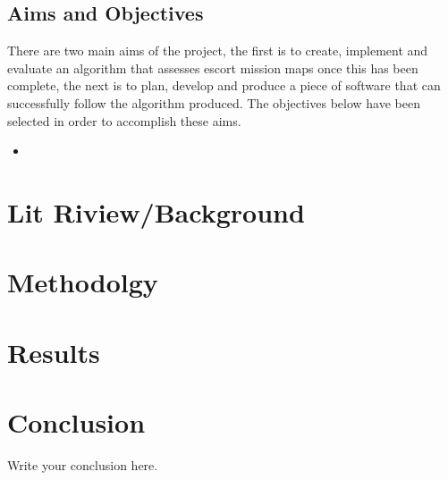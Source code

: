 \documentclass{article}
\begin{document}
\subsection{Aims and Objectives}
There are two main aims of the project, the first is to create, implement and evaluate an algorithm that assesses escort mission maps once this has been complete, the next is to plan, develop and produce a piece of software that can successfully follow the algorithm produced. The objectives below have been selected in order to accomplish these aims.
 \begin{itemize}
	\item 
\end{itemize}

\section{Lit Riview/Background}

\section{Methodolgy}

\section{Results}

\section{Conclusion}
Write your conclusion here.



\end{document}
